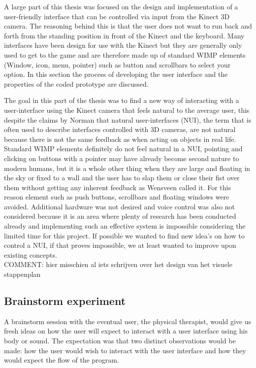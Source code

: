 A large part of this thesis was focused on the design and implementation of a user-friendly interface that can be controlled via input from the Kinect 3D camera. The reasoning behind this is that the user does not want to run back and forth from the standing position in front of the Kinect and the keyboard. Many interfaces have been design for use with the Kinect but they are generally only used to get to the game and are therefore made up of standard WIMP elements (Window, icon, menu, pointer) such as button and scrollbars to select your option. In this section the process of developing the user interface and the properties of the coded prototype are discussed.

The goal in this part of the thesis was to find a new way of interacting with a user-interface using the Kinect camera that feels natural to the average user, this despite the claims by Norman \cite{Norman2010} that natural user-interfaces (NUI), the term that is often used to describe interfaces controlled with 3D cameras, are not natural because there is not the same feedback as when acting on objects in real life. Standard WIMP elements definitely do not feel natural in a NUI, pointing and clicking on buttons with a pointer may have already become second nature to modern humans, but it is a whole other thing when they are large and floating in the sky or fixed to a wall and the user has to slap them or close their fist over them without getting any inherent feedback as Wensveen \cite{Wensveen2004} called it. For this reason element such as push buttons, scrollbars and floating windows were avoided. Additional hardware was not desired and voice control was also not considered because it is an area where plenty of research has been conducted already and implementing such an effective system is impossible considering the limited time for this project. If possible we wanted to find new idea's on how to control a NUI, if that proves impossible, we at least wanted to improve upon existing concepts.\\

 {\large COMMENT: hier misschien al iets schrijven over het design van het visuele stappenplan }



\subsection{Brainstorm experiment}

A brainstorm session with the eventual user, the physical therapist, would give us fresh ideas on how the user will expect to interact with a user interface using his body or sound. The expectation was that two distinct observations would be made: how the user would wish to interact with the user interface and how they would expect the flow of the program. 

